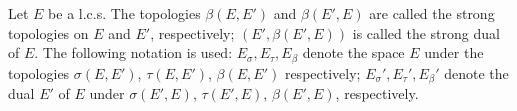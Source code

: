 Let $E$ be a l.c.s. The topologies $\beta(E, E')$ and $\beta(E', E)$ are called the strong topologies on $E$ and $E'$, respectively; $(E', \beta(E', E))$ is called the strong dual of $E$. The following notation is used: $E_{\sigma}, E_{\tau}, E_{\beta}$ denote the space $E$ under the topologies $\sigma(E, E')$, $\tau(E, E')$, $\beta(E, E')$ respectively; $E_{\sigma}', E_{\tau}', E_{\beta}'$ denote the dual $E'$ of $E$ under $\sigma(E', E)$, $\tau(E', E)$, $\beta(E', E)$, respectively.
